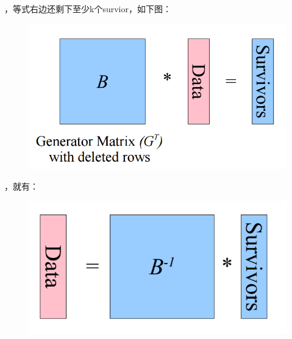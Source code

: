 \documentclass{article}
\begin{document}
，等式右边还剩下至少k个survior，如下图：%

\begin{figure}[tbp]%
\begin{mdcenter}%

\noindent\includegraphics[keepaspectratio=true,width=\dimmin{}{\dimwidth{0.60}}]{images/rs3}{}%

\mdhr{}%

\noindent{}%
\end{mdcenter}%
\end{figure}%

，就有：%

\begin{figure}[tbp]%
\begin{mdcenter}%

\noindent\includegraphics[keepaspectratio=true,width=\dimmin{}{\dimwidth{0.60}}]{images/rs5}{}%

\mdhr{}%

\noindent{}%
\end{mdcenter}%
\end{figure}%
\end{document}
